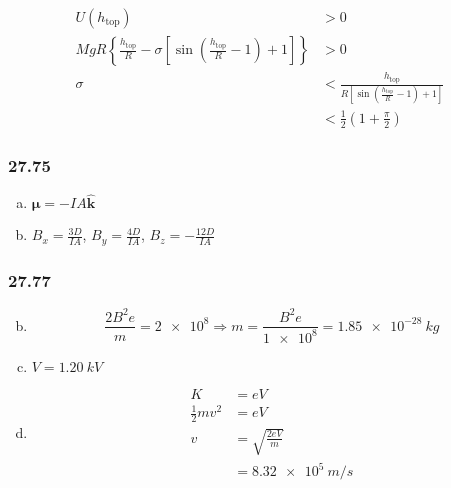 \documentclass{article}
\begin{document}
\begin{enumerate}[(a)]
        \begin{align*}
          U(h_\textrm{top})                                                                                                            & > 0                                                                                            \\
          M g R \left\{ \frac{h_\textrm{top}}{R} - \sigma \left[ \sin \left( \frac{h_\textrm{top}}{R} - 1 \right) + 1 \right] \right\} & > 0                                                                                            \\
          \sigma                                                                                                                       & < \frac{h_\textrm{top}}{R \left[ \sin \left( \frac{h_\textrm{top}}{R} - 1 \right) + 1 \right]} \\
                                                                                                                                       & < \frac{1}{2} \left( 1 + \frac{\pi}{2} \right)
        \end{align*}
\end{enumerate}

\subsubsection{27.75}

\begin{enumerate}[(a)]
  \item $\boldsymbol{\mu} = -I A \hat{\mathbf{k}}$

  \item $B_x = \frac{3 D}{I A}$, $B_y = \frac{4 D}{I A}$, $B_z = -\frac{12 D}{I A}$
\end{enumerate}

\subsubsection{27.77}

\begin{enumerate}[(a)]
  \setcounter{enumi}{1}
  \item \[\frac{2 B^2 e}{m} = \num{2e8} \Rightarrow m = \frac{B^2 e}{\num{1e8}} = \qty{1.85e-28}{kg}\]

  \item $V = \qty{1.20}{kV}$

  \item

        \begin{align*}
          K                 & = e V                    \\
          \frac{1}{2} m v^2 & = e V                    \\
          v                 & = \sqrt{\frac{2 e V}{m}} \\
                            & = \qty{8.32e5}{m/s}
        \end{align*}
\end{enumerate}
\end{document}
